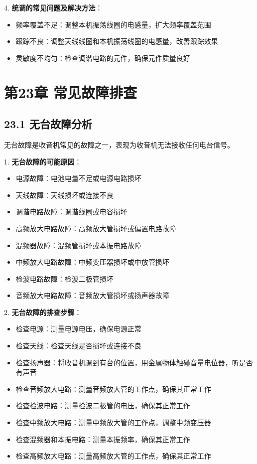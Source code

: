 \documentclass[12pt,UTF8]{ctexbook}
\begin{document}
4. \textbf{统调的常见问题及解决方法}：
   \begin{itemize}[leftmargin=3.5em]
   \item 频率覆盖不足：调整本机振荡线圈的电感量，扩大频率覆盖范围
   \item 跟踪不良：调整天线线圈和本机振荡线圈的电感量，改善跟踪效果
   \item 灵敏度不均匀：检查调谐电路的元件，确保元件质量良好
   \end{itemize}

\chapter*{第23章 常见故障排查}
\section*{23.1 无台故障分析}

无台故障是收音机常见的故障之一，表现为收音机无法接收任何电台信号。

1. \textbf{无台故障的可能原因}：
   \begin{itemize}[leftmargin=3.5em]
   \item 电源故障：电池电量不足或电源电路损坏
   \item 天线故障：天线损坏或连接不良
   \item 调谐电路故障：调谐线圈或电容损坏
   \item 高频放大电路故障：高频放大管损坏或偏置电路故障
   \item 混频器故障：混频管损坏或本振电路故障
   \item 中频放大电路故障：中频变压器损坏或中放管损坏
   \item 检波电路故障：检波二极管损坏
   \item 音频放大电路故障：音频放大管损坏或扬声器故障
   \end{itemize}

2. \textbf{无台故障的排查步骤}：
   \begin{itemize}[leftmargin=3.5em]
   \item 检查电源：测量电源电压，确保电源正常
   \item 检查天线：检查天线是否损坏或连接不良
   \item 检查扬声器：将收音机调到有台的位置，用金属物体触碰音量电位器，听是否有声音
   \item 检查音频放大电路：测量音频放大管的工作点，确保其正常工作
   \item 检查检波电路：测量检波二极管的电压，确保其正常工作
   \item 检查中频放大电路：测量中频放大管的工作点，调整中频变压器
   \item 检查混频器和本振电路：测量本振频率，确保其正常工作
   \item 检查高频放大电路：测量高频放大管的工作点，确保其正常工作
   \end{itemize}
\end{document}
